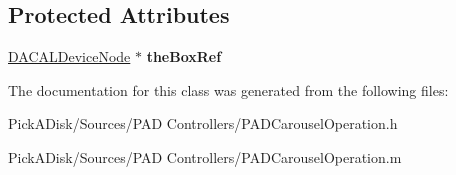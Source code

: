 \subsection*{Protected Attributes}
\begin{DoxyCompactItemize}
\item 
\hypertarget{interface_p_a_d_operation_task_af35153f874686ac5da07d994d27339e8}{
\hyperlink{interface_d_a_c_a_l_device_node}{DACALDeviceNode} $\ast$ {\bfseries theBoxRef}}
\label{interface_p_a_d_operation_task_af35153f874686ac5da07d994d27339e8}

\end{DoxyCompactItemize}


The documentation for this class was generated from the following files:\begin{DoxyCompactItemize}
\item 
PickADisk/Sources/PAD Controllers/PADCarouselOperation.h\item 
PickADisk/Sources/PAD Controllers/PADCarouselOperation.m\end{DoxyCompactItemize}
